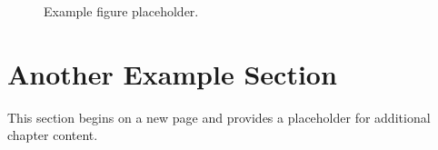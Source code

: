 \begin{figure}[ht]
  \centering
  \caption{Example figure placeholder.}
  \label{fig:example-placeholder}
\end{figure}

\clearpage

\section{Another Example Section}

This section begins on a new page and provides a placeholder for additional
chapter content.
